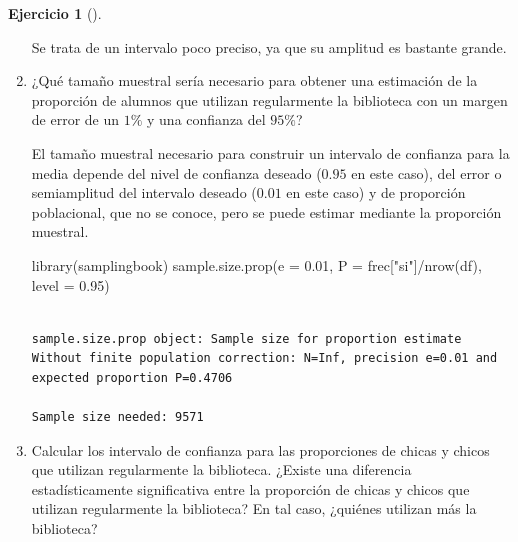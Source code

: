 \documentclass[
  a4paper,
]{scrreport}
\newenvironment{Shaded}{\begin{snugshade}}{\end{snugshade}}
\newcommand{\AttributeTok}[1]{\textcolor[rgb]{0.40,0.45,0.13}{#1}}
\newcommand{\FloatTok}[1]{\textcolor[rgb]{0.68,0.00,0.00}{#1}}
\newcommand{\FunctionTok}[1]{\textcolor[rgb]{0.28,0.35,0.67}{#1}}
\newcommand{\NormalTok}[1]{\textcolor[rgb]{0.00,0.23,0.31}{#1}}
\newcommand{\SpecialCharTok}[1]{\textcolor[rgb]{0.37,0.37,0.37}{#1}}
\newcommand{\StringTok}[1]{\textcolor[rgb]{0.13,0.47,0.30}{#1}}
\theoremstyle{definition}
\newtheorem{exercise}{Ejercicio}[chapter]
\theoremstyle{remark}
\begin{document}
\begin{exercise}[]
\begin{enumerate}
\begin{tcolorbox}
  Se trata de un intervalo poco preciso, ya que su amplitud es bastante
  grande.

  \end{tcolorbox}
\item
  ¿Qué tamaño muestral sería necesario para obtener una estimación de la
  proporción de alumnos que utilizan regularmente la biblioteca con un
  margen de error de un \(1\%\) y una confianza del \(95\%\)?

  \begin{tcolorbox}[enhanced jigsaw, coltitle=black, left=2mm, colback=white, leftrule=.75mm, toptitle=1mm, breakable, bottomrule=.15mm, titlerule=0mm, bottomtitle=1mm, title=\textcolor{quarto-callout-tip-color}{\faLightbulb}\hspace{0.5em}{Solución}, arc=.35mm, toprule=.15mm, rightrule=.15mm, colframe=quarto-callout-tip-color-frame, opacityback=0, colbacktitle=quarto-callout-tip-color!10!white, opacitybacktitle=0.6]

  El tamaño muestral necesario para construir un intervalo de confianza
  para la media depende del nivel de confianza deseado (\(0.95\) en este
  caso), del error o semiamplitud del intervalo deseado (\(0.01\) en
  este caso) y de proporción poblacional, que no se conoce, pero se
  puede estimar mediante la proporción muestral.

\begin{Shaded}
\begin{Highlighting}[]
\FunctionTok{library}\NormalTok{(samplingbook)}
\FunctionTok{sample.size.prop}\NormalTok{(}\AttributeTok{e =} \FloatTok{0.01}\NormalTok{, }\AttributeTok{P =}\NormalTok{ frec[}\StringTok{"si"}\NormalTok{]}\SpecialCharTok{/}\FunctionTok{nrow}\NormalTok{(df), }\AttributeTok{level =} \FloatTok{0.95}\NormalTok{)}
\end{Highlighting}
\end{Shaded}

\begin{verbatim}

sample.size.prop object: Sample size for proportion estimate
Without finite population correction: N=Inf, precision e=0.01 and expected proportion P=0.4706

Sample size needed: 9571
\end{verbatim}

  \end{tcolorbox}
\item
  Calcular los intervalo de confianza para las proporciones de chicas y
  chicos que utilizan regularmente la biblioteca. ¿Existe una diferencia
  estadísticamente significativa entre la proporción de chicas y chicos
  que utilizan regularmente la biblioteca? En tal caso, ¿quiénes
  utilizan más la biblioteca?


\end{enumerate}
\end{exercise}
\end{document}
